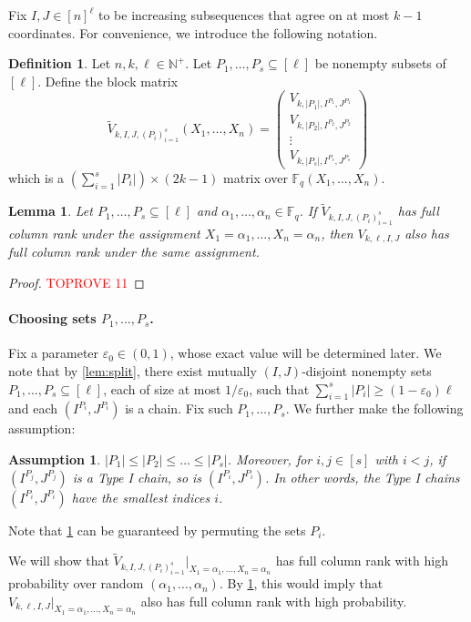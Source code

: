 \documentclass[11pt]{article}
\theoremstyle{plain}
\newtheorem{assumption}{Assumption}
\newtheorem{lemma}[thm]{Lemma}
\theoremstyle{definition}
\newtheorem{defn}[thm]{Definition}
\theoremstyle{remark}
\newcommand{\N}{\mathbb{N}}
\newcommand{\F}{\mathbb{F}}
\newcommand{\eps}{\varepsilon}
\begin{document}
Fix $I,J\in [n]^\ell$ to be increasing subsequences that agree on at most $k-1$ coordinates.
For convenience, we introduce the following notation.

\begin{defn}\label{defn:blocks}
Let $n,k,\ell\in\N^+$. Let $P_1,\dots,P_s\subseteq [\ell]$ be nonempty subsets of $[\ell]$.
Define the block matrix
\[
\widetilde{V}_{k,I,J,(P_i)_{i=1}^s}(X_1,\dots,X_n)=\begin{pmatrix}
    V_{k,|P_1|,I^{P_1},J^{P_1}}\\
    V_{k,|P_2|,I^{P_2},J^{P_2}}\\
    \vdots\\
    V_{k,|P_s|,I^{P_s},J^{P_s}}
\end{pmatrix}
\]
which is a $\left(\sum_{i=1}^s |P_i|\right) \times (2k-1)$ matrix over $\F_q(X_1,\dots,X_n)$.
\end{defn}
\begin{lemma}\label{lem:submatrix}
Let $P_1,\dots,P_s\subseteq [\ell]$ and $\alpha_1,\dots,\alpha_n\in\F_q$.
If $\widetilde{V}_{k,I,J,(P_i)_{i=1}^s}$ has full column rank under the assignment $X_1=\alpha_1,\dots,X_n=\alpha_n$, then $V_{k,\ell,I,J}$ also has full column rank under the same assignment.
\end{lemma}
\begin{proof}\textcolor{red}{TOPROVE 11}\end{proof}


\paragraph{Choosing sets $P_1,\dots,P_s$.}
Fix a parameter $\eps_0\in (0,1)$, whose exact value will be determined later. 
We note that by 
\cref{lem:split}, there exist mutually $(I,J)$-disjoint nonempty sets $P_1,\dots,P_s\subseteq [\ell]$, each of size at most $1/\eps_0$, such that $\sum_{i=1}^s |P_i|\geq (1-\eps_0)\ell$ and each $(I^{P_i}, J^{P_i})$ is a chain.
Fix such $P_1,\dots,P_s$.
We further make the following assumption:
\begin{assumption}\label{order-on-Pi}
$|P_1|\leq |P_2|\leq \dots \leq |P_s|$. Moreover, for $i,j\in [s]$ with $i<j$, if $(I^{P_j}, J^{P_j})$ is a Type I chain, so is $(I^{P_i}, J^{P_i})$. In other words, the Type I chains $(I^{P_i}, J^{P_i})$ have the smallest indices $i$.
\end{assumption}
Note that \cref{order-on-Pi} can be guaranteed by permuting the sets $P_i$. 

We will show that $\widetilde{V}_{k,I,J,(P_i)_{i=1}^s}|_{X_1=\alpha_1,\dots,X_n=\alpha_n}$ has full column rank with high probability over random $(\alpha_1,\dots,\alpha_n)$. By \cref{lem:submatrix}, this would imply that $V_{k,\ell,I,J}|_{X_1=\alpha_1,\dots,X_n=\alpha_n}$ also has full column rank with high probability.
\end{document}
